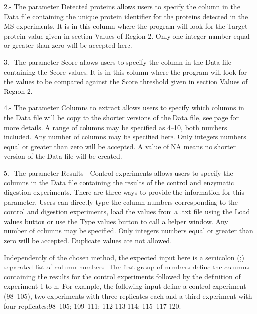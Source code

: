 \num{2}.- The parameter Detected proteins allows users to specify the column in the Data file containing the unique protein identifier for the proteins detected in the MS experiments. It is in this column where the program will look for the Target protein value given in section Values of Region \num{2}. Only one integer number equal or greater than zero will be accepted here.

\num{3}.- The parameter Score allows users to specify the column in the Data file containing the Score values. It is in this column where the program will look for the values to be compared against the Score threshold given in section Values of Region \num{2}.

\num{4}.- The parameter Columns to extract\label{par:tarprotColExt} allows users to specify which columns in the Data file will be copy to the shorter versions of the Data file, see page \pageref{subsec:utilShortDF} for more details. A range of columns may be specified as \numrange[range-phrase = --]{4}{10}, both numbers included. Any number of columns may be specified here. Only integers numbers equal or greater than zero will be accepted. A value of NA means no shorter version of the Data file will be created.

\num{5}.- \label{par:tarprotResultControl}The parameter Results - Control experiments allows users to specify the columns in the Data file containing the results of the control and enzymatic digestion experiments. There are three ways to provide the information for this parameter. Users can directly type the column numbers corresponding to the control and digestion experiments, load the values from a .txt file using the Load values button or use the Type values button to call a helper window. Any number of columns may be specified. Only integers numbers equal or greater than zero will be accepted. Duplicate values are not allowed.

Independently of the chosen method, the expected input here is a semicolon (;) separated list of column numbers. The first group of numbers define the columns containing the results for the control experiments followed by the definition of experiment \num{1} to n. For example, the following input define a control experiment (\numrange[range-phrase = --]{98}{105}), two experiments with three replicates each and a third experiment with four replicates:\newline \numrange[range-phrase = --]{98}{105}; \numrange[range-phrase = --]{109}{111}; 112 113 114; \numrange[range-phrase = --]{115}{117} 120. 

